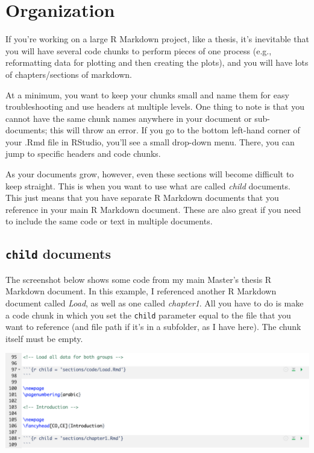 \documentclass[
]{book}
\begin{document}
\hypertarget{organization}{%
\chapter{Organization}\label{organization}}

If you're working on a large R Markdown project, like a thesis, it's inevitable that you will have several code chunks to perform pieces of one process (e.g., reformatting data for plotting and then creating the plots), and you will have lots of chapters/sections of markdown.

At a minimum, you want to keep your chunks small and name them for easy troubleshooting and use headers at multiple levels. One thing to note is that you cannot have the same chunk names anywhere in your document or sub-documents; this will throw an error. If you go to the bottom left-hand corner of your .Rmd file in RStudio, you'll see a small drop-down menu. There, you can jump to specific headers and code chunks.

As your documents grow, however, even these sections will become difficult to keep straight. This is when you want to use what are called \emph{child} documents. This just means that you have separate R Markdown documents that you reference in your main R Markdown document. These are also great if you need to include the same code or text in multiple documents.

\hypertarget{child-documents}{%
\section{\texorpdfstring{\texttt{child} documents}{child documents}}\label{child-documents}}

The screenshot below shows some code from my main Master's thesis R Markdown document. In this example, I referenced another R Markdown document called \emph{Load}, as well as one called \emph{chapter1}. All you have to do is make a code chunk in which you set the \texttt{child} parameter equal to the file that you want to reference (and file path if it's in a subfolder, as I have here). The chunk itself must be empty.

\includegraphics[width=23in]{images/content_child_call}
\end{document}
